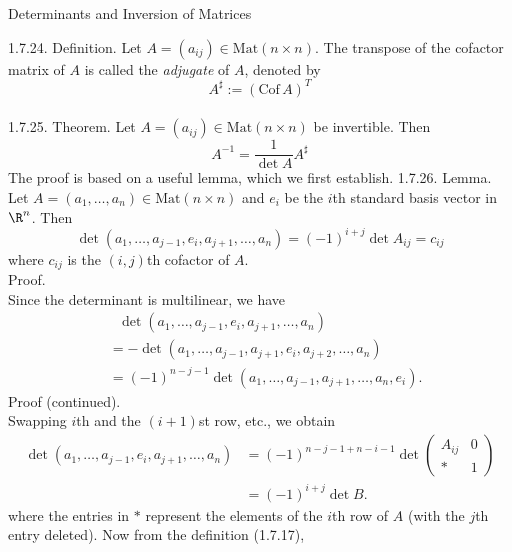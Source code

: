 \documentclass[smaller,hyperref={CJKbookmarks=true}]{beamer}
\begin{document}
\begin{frame}{Determinants and Inversion of Matrices}
\begin{spacing}{1.1}
\vspace*{18pt}
\alert{1.7.24. Definition.} Let $A=(a_{ij})\in\text{Mat}(n\times n)$. The transpose of the cofactor matrix of $A$ is called the \emph{adjugate} of $A$, denoted by
\[A^{\sharp}:=(\text{Cof}\,A)^T\]
 \\[9pt]
\alert{1.7.25. Theorem.} Let $A=(a_{ij})\in\text{Mat}(n\times n)$ be invertible. Then
\[A^{-1}=\frac{1}{\det A}A^{\sharp}\]
The proof is based on a useful lemma, which we first establish.
\newpage
\vspace*{14pt}
\alert{1.7.26. Lemma.} Let $A=(a_1,\ldots,a_n)\in\text{Mat}(n\times n)$ and $e_i$ be the $i$th standard basis vector in $\R^n$. Then
\[\det(a_1,\ldots,a_{j-1},e_i,a_{j+1},\ldots,a_n)=(-1)^{i+j}\det A_{ij}=c_{ij}\]
where $c_{ij}$ is the $(i,j)$th cofactor of $A$.\\[8pt]
\alert{Proof.}\\
Since the determinant is multilinear, we have
\begin{equation*}
  \begin{split}
       &~~~\det(a_1,\ldots,a_{j-1},e_i,a_{j+1},\ldots,a_n)  \\
       &=-\det(a_1,\ldots,a_{j-1},a_{j+1},e_i,a_{j+2},\ldots,a_n)  \\
       &=(-1)^{n-j-1}\det(a_1,\ldots,a_{j-1},a_{j+1},\ldots,a_n,e_i).
  \end{split}
\end{equation*}
\newpage
\vspace*{15pt}
\alert{Proof (continued).}\\
Swapping $i$th and the $(i+1)$st row, etc., we obtain
\begin{equation*}
  \begin{split}
     \det(a_1,\ldots,a_{j-1},e_i,a_{j+1},\ldots,a_n) &=(-1)^{n-j-1+n-i-1}\det\begin{pmatrix}
                               A_{ij} & 0 \\
                               * & 1
                             \end{pmatrix} \\
       &=(-1)^{i+j}\det B.
  \end{split}
\end{equation*}
where the entries in $*$ represent the elements of the $i$th row of $A$ (with the
$j$th entry deleted). Now from the definition (1.7.17),

\end{spacing}
\end{frame}
\end{document}
